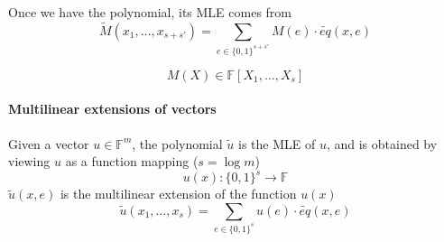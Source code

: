 \documentclass{article}
\theoremstyle{definition}
\begin{document}
Once we have the polynomial, its MLE comes from
$$\widetilde{M}(x_1, \ldots, x_{s+s'}) = \sum_{e \in \{0,1\}^{s+s'}} M(e) \cdot \widetilde{eq}(x, e)$$

$$M(X) \in \mathbb{F}[X_1, \ldots, X_s]$$

\paragraph{Multilinear extensions of vectors}
Given a vector $u \in \mathbb{F}^m$, the polynomial $\widetilde{u}$ is the MLE of $u$, and is obtained by viewing $u$ as a function mapping ($s=\log m$)
$$u(x): \{0,1\}^s \rightarrow \mathbb{F}$$
$\widetilde{u}(x, e)$ is the multilinear extension of the function $u(x)$
$$\widetilde{u}(x_1, \ldots, x_s) = \sum_{e \in \{0,1\}^s} u(e) \cdot \widetilde{eq}(x, e)$$



\end{document}
